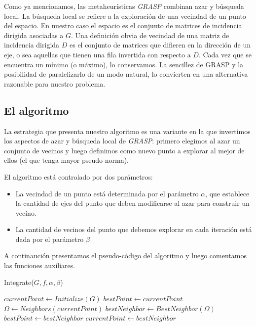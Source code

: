 \documentclass[10pt, a4paper, twocolumn]{article} %
\begin{document}
\smallskip

Como ya mencionamos, las metaheurísticas \textit{GRASP} combinan azar y 
búsqueda local. La búsqueda local se refiere a la exploración de 
una vecindad de un punto del espacio. En nuestro caso el espacio es el 
conjunto de matrices de incidencia dirigida asociadas a $G$. Una 
definición obvia de vecindad de una matriz de incidencia dirigida $D$ es 
el conjunto de matrices que difieren en la dirección de un eje, o sea 
aquellas que tienen una fila invertida con respecto a $D$. Cada vez que 
se encuentra un mínimo (o máximo), lo conservamos. La sencillez de 
GRASP y la posibilidad de paralelizarlo de un modo natural, lo 
convierten en una alternativa razonable para nuestro problema.

\subsection{El algoritmo}

La estrategia que presenta nuestro algoritmo es una variante en la que 
invertimos los aspectos de azar y búsqueda local de \textit{GRASP}: 
primero elegimos al azar un conjunto de vecinos y luego definimos como 
nuevo punto a explorar al mejor de ellos (el que tenga mayor 
pseudo-norma). 

\smallskip

El algoritmo está controlado por dos parámetros:

\begin{itemize}
	\item La vecindad de un punto está determinada por el parámetro 
	$\alpha$, que establece la cantidad de ejes del punto que deben 
	modificarse al azar para construir un vecino.
	\item La cantidad de vecinos del punto que debemos explorar en cada 
	iteración está dada por el parámetro $\beta$
\end{itemize}

A continaución presentamos el pseudo-código del algoritmo y luego 
comentamos las funciones auxiliares.

\begin{algorithm}
    \caption{Integrate($G,f,\alpha,\beta$)}
	\begin{algorithmic}
		\State $currentPoint \gets Initialize(G)$
		\State $bestPoint \gets currentPoint$
			\State $\Omega \gets Neighbors(currentPoint)$
			\State $bestNeighbor \gets BestNeighbor(\Omega)$
				\State $bestPoint \gets bestNeighbor$
			\EndIf
			\State $currentPoint \gets bestNeighbor$
		\EndWhile
	\end{algorithmic}
\end{algorithm}
\end{document}

